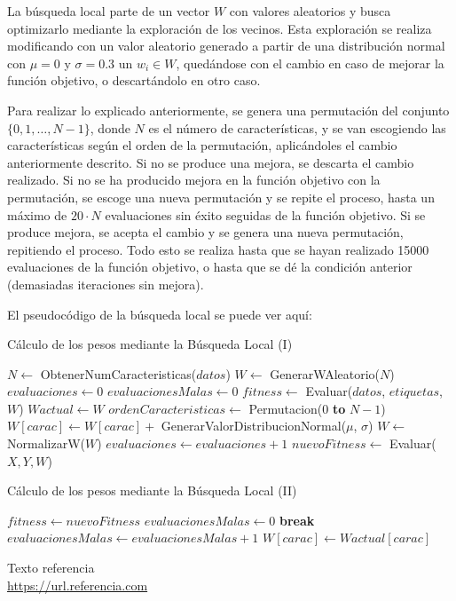 \documentclass[11pt,a4paper]{article}
\begin{document}
La búsqueda local parte de un vector $W$ con valores aleatorios y busca optimizarlo mediante la exploración de los vecinos.
Esta exploración se realiza modificando con un valor aleatorio generado a partir de una distribución normal con $\mu = 0$ y 
$\sigma = 0.3$ un $w_i \in W$, quedándose con el cambio en caso de mejorar la función objetivo, o descartándolo en otro caso.

Para realizar lo explicado anteriormente, se genera una permutación del conjunto $\lbrace 0, 1, \dots , N-1 \rbrace$, donde $N$
es el número de características, y se van escogiendo las características según el orden de la permutación, aplicándoles
el cambio anteriormente descrito. Si no se produce una mejora, se descarta el cambio realizado. Si no se ha producido mejora
en la función objetivo con la permutación, se escoge una nueva permutación y se repite el proceso, hasta un máximo de $20
\cdot N$ evaluaciones sin éxito seguidas de la función objetivo. Si se produce mejora, se acepta el cambio y se genera una
nueva permutación, repitiendo el proceso. Todo esto se realiza hasta que se hayan realizado 15000 evaluaciones de la función
objetivo, o hasta que se dé la condición anterior (demasiadas iteraciones sin mejora).

El pseudocódigo de la búsqueda local se puede ver aquí:

\begin{algorithm}[H]
\label{alg:local-search}
\caption{Cálculo de los pesos mediante la Búsqueda Local (I)}
\begin{algorithmic}[1]
\State $N \gets $ ObtenerNumCaracteristicas($datos$)
\State $W \gets$ GenerarWAleatorio($N$)
\State $evaluaciones \gets 0$
\State $evaluacionesMalas \gets 0$
\State $fitness \gets$ Evaluar($datos$, $etiquetas$, $W$)
\State $Wactual \gets W$
\State $ordenCaracteristicas \gets $ Permutacion(0 \textbf{to} $N - 1$)
	\State $W[carac] \gets W[carac] + $ GenerarValorDistribucionNormal($\mu$, $\sigma$)	
	\State $W \gets$ NormalizarW($W$)
	\State $evaluaciones \gets evaluaciones + 1$
	\State $nuevoFitness \gets$ Evaluar($X, Y, W$)		
\end{algorithmic}
\end{algorithm}

\begin{algorithm}[H]
\caption{Cálculo de los pesos mediante la Búsqueda Local (II)}
\begin{algorithmic}
		\State $fitness \gets nuevoFitness$		
		\State $evaluacionesMalas \gets 0$		
		\State \textbf{break}
	\Else
		\State $evaluacionesMalas \gets evaluacionesMalas + 1$		
		\State $W[carac] \gets Wactual[carac]$		
	\EndIf	
		\State {}
	\EndIf
\EndFor
\EndWhile
\State {}
\EndFunction
\end{algorithmic}
\end{algorithm}

\newpage

\newpage

\begin{thebibliography}{5}

Texto referencia
\\\url{https://url.referencia.com}

\end{thebibliography}
\end{document}
